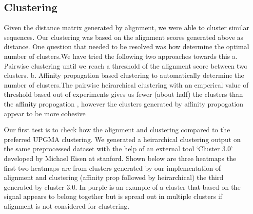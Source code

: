 \documentclass[aps,prd,final,onecolumn,a4paper,10pt]{revtex4}
\begin{document}
\subsection{Clustering}


Given the distance matrix generated by alignment, we were able to cluster similar sequences.
Our clustering was based on the alignment scores generated above as distance.
One question that needed to be resolved was how determine the optimal number of
clusters.We have tried the following two approaches towards this
a. Pairwise clustering until we reach a threshold of the alignment score between
two clusters.
b. Affinity propagation based clustering to automatically determine the number of
clusters.The pairwise heirarchical clustering with an emperical value of threshold based
out of experiments gives us fewer (about half) the clusters than the affinity propogation ,
however the clusters generated by affinity propogation appear to be more cohesive

Our first test is to check how the alignment and clustering compared to the
preferred UPGMA clustering. We generated a heirarchical clustering output on the
same preprocessed dataset with the help of an external tool ‘Cluster 3.0’
developed by Michael Eisen at stanford.
Shown below are three heatmaps the first two heatmaps are from clusters
generated by our implementation of alignment and clustering (affinity prop
followed by heirarchical) the third generated by cluster 3.0. In purple is an
example of a cluster that based on the signal appears to belong together but is
spread out in multiple clusters if alignment is not considered for clustering.
\end{document}
